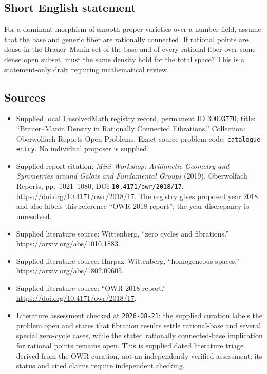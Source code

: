 \documentclass[11pt]{article}
\begin{document}
\subsection{Short English statement}
For a dominant morphism of smooth proper varieties over a number field, assume that the base and generic fiber are rationally connected. If rational points are dense in the Brauer--Manin set of the base and of every rational fiber over some dense open subset, must the same density hold for the total space? This is a statement-only draft requiring mathematical review.
\subsection{Sources}
\begin{itemize}
\item Supplied local UnsolvedMath registry record, permanent ID \(30003770\), title: ``Brauer--Manin Density in Rationally Connected Fibrations.'' Collection: Oberwolfach Reports Open Problems. Exact source problem code: \texttt{catalogue entry}. No individual proposer is supplied.
\item Supplied report citation: \emph{Mini-Workshop: Arithmetic Geometry and Symmetries around Galois and Fundamental Groups} (2019), Oberwolfach Reports, pp.~1021--1080, DOI \texttt{10.4171/owr/2018/17}. \url{https://doi.org/10.4171/owr/2018/17}. The registry gives proposed year 2018 and also labels this reference ``OWR 2018 report''; the year discrepancy is unresolved.
\item Supplied literature source: Wittenberg, ``zero cycles and fibrations.'' \url{https://arxiv.org/abs/1010.1883}.
\item Supplied literature source: Harpaz--Wittenberg, ``homogeneous spaces.'' \url{https://arxiv.org/abs/1802.09605}.
\item Supplied literature source: ``OWR 2018 report.'' \url{https://doi.org/10.4171/owr/2018/17}.
\item Literature assessment checked at \texttt{2026-08-21}: the supplied curation labels the problem open and states that fibration results settle rational-base and several special zero-cycle cases, while the stated rationally connected-base implication for rational points remains open. This is supplied dated literature triage derived from the OWR curation, not an independently verified assessment; its status and cited claims require independent checking.
\end{itemize}
\end{document}
